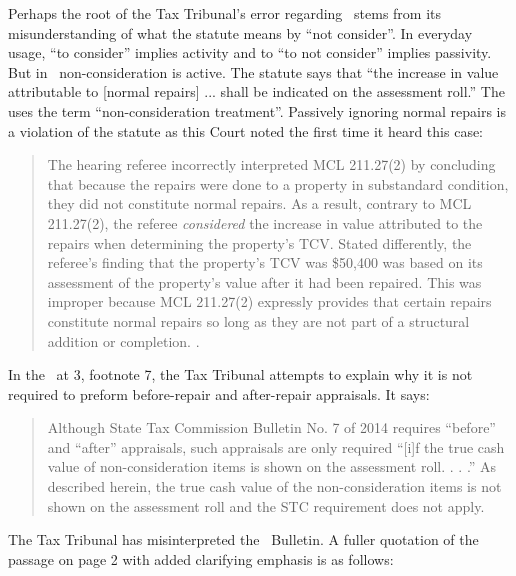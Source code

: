 \documentclass[12pt,\documentclassflag]{michiganCourtOfAppealsBrief}
\def\mathieuGast{\pincite[l]{MCL}{211.27(2)}}
\begin{document}
Perhaps the root of the Tax Tribunal's error regarding \mathieuGast\ stems from its misunderstanding of what the statute means by ``not consider''. In everyday usage, ``to consider'' implies activity and to ``to not consider'' implies passivity. But in \mathieuGast\ non-consideration is active. The statute says that ``the increase in value attributable to [normal repairs] ... shall be indicated on the assessment roll.'' The \cite[s]{STC Bulletin 7 of 2014} uses the term ``non-consideration treatment''. Passively ignoring normal repairs is a violation of the statute as this Court noted the first time it heard this case:

\begin{quote}
  The hearing referee incorrectly interpreted MCL 211.27(2) by concluding that because the repairs were done to a property in substandard condition, they did not constitute normal repairs. As a result, contrary to MCL 211.27(2), the referee \textit{considered} the increase in value attributed to the repairs when determining the property's TCV. Stated differently, the referee's finding that the property's TCV was \$50,400 was based on its assessment of the property's value after it had been repaired. This was improper because MCL 211.27(2) expressly provides that certain repairs constitute normal repairs so long as they are not part of a structural addition or completion. .
\end{quote}

In the \orderDenying\ at 3, footnote 7, the Tax Tribunal attempts to explain why it is not required to preform before-repair and after-repair appraisals. It says: 

\begin{quote}
	Although State Tax Commission Bulletin No. 7 of 2014 requires ``before'' and ``after'' appraisals, such appraisals are only required ``[i]f the true cash value of non-consideration items is shown on the assessment roll. . . .'' As described herein, the true cash value of the non-consideration items is not shown on the assessment roll and the STC requirement does not apply.
\end{quote}

The Tax Tribunal has misinterpreted the \STC\ Bulletin. A fuller quotation of the passage on page 2 with added clarifying emphasis is as follows:
\end{document}
